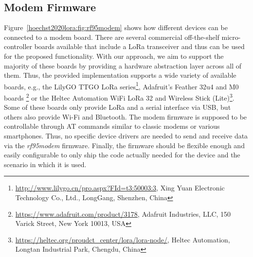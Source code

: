 \subsection{Modem Firmware}
Figure~\ref{hoechst2020lora:fig:rf95modem} shows how different devices can be connected to a modem board. 
There are several commercial off-the-shelf micro-controller boards available that include a LoRa transceiver and thus can be used for the proposed functionality.
With our approach, we aim to support the majority of these boards by providing a hardware abstraction layer across all of them.
Thus, the provided implementation supports a wide variety of available boards, e.g., 
the LilyGO TTGO LoRa series\footnote{\url{http://www.lilygo.cn/pro.aspx?FId=t3:50003:3}, Xing Yuan Electronic Technology Co., Ltd., LongGang, Shenzhen, China},
Adafruit's Feather 32u4 and M0 boards \footnote{\url{https://www.adafruit.com/product/3178}, Adafruit Industries, LLC, 150 Varick Street, New York 10013, USA} or 
the Heltec Automation WiFi LoRa 32 and Wireless Stick (Lite)\footnote{\url{https://heltec.org/proudct_center/lora/lora-node/}, Heltec Automation, Longtan Industrial Park, Chengdu, China}.
Some of these boards only provide LoRa and a serial interface via USB, but others also provide Wi-Fi and Bluetooth.
The modem firmware is supposed to be controllable through AT commands similar to classic modems or various smartphones. 
Thus, no specific device drivers are needed to send and receive data via the \textit{rf95modem} firmware.
Finally, the firmware should be flexible enough and easily configurable to only ship the code actually needed for the device and the scenario in which it is used.


